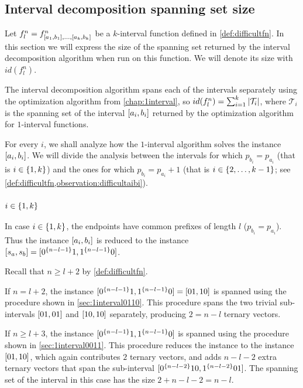 \subsection{Interval decomposition spanning set size}

Let $f_l^n =
f^n_{[a_1, b_1], \ldots, [a_k, b_k]}$
be a $k$-interval function
defined in \cref{def:difficultfn}.
In this section we will express
the size of the spanning set
returned by the interval decomposition algorithm
when run on this function.
We will denote its size with $id(f_l^n)$.

The interval decomposition algorithm spans
each of the intervals separately
using the optimization algorithm
from \cref{chap:1interval},
so $id(f_l^n) = \sum_{i=1}^k{\lvert\mathcal{T}_i\rvert}$,
where $\mathcal{T}_i$ is the spanning set
of the interval $[a_i, b_i]$
returned by the optimization algorithm
for $1$-interval functions.

For every $i$,
we shall analyze how the $1$-interval algorithm solves
the instance $[a_i, b_i]$.
We will divide the analysis between the intervals
for which $p_{b_i} = p_{a_i}$
(that is $i \in \{1, k\}$)
and the ones for which $p_{b_i} = p_{a_i} + 1$
(that is $i \in \{2, \ldots, k-1\}$;
see
\cref{def:difficultfn,observation:difficultaibi}).

\subsubsection{$i \in \{1, k\}$}

In case $i \in \{1, k\}$,
the endpoints have common prefixes of length $l$
($p_{b_i} = p_{a_i}$).
Thus the instance $[a_i, b_i]$
is reduced to the instance
$[s_a, s_b]
= [0^{\{n-l-1\}} 1, 1^{\{n-l-1\}} 0]$.

Recall that $n \geq l + 2$ by \cref{def:difficultfn}.

If $n = l + 2$,
the instance
$[0^{\{n-l-1\}} 1, 1^{\{n-l-1\}} 0]
= [01, 10]$
is spanned using the procedure
shown in \cref{sec:1interval0110}.
This procedure spans the two trivial sub-intervals
$[01, 01]$ and $[10, 10]$
separately,
producing $2 = n-l$ ternary vectors.

If $n \geq l + 3$,
the instance
$[0^{\{n-l-1\}} 1, 1^{\{n-l-1\}} 0]$
is spanned using the procedure
shown in \cref{sec:1interval0011}.
This procedure reduces the instance
to the instance $[01, 10]$,
which again contributes $2$ ternary vectors,
and adds $n-l-2$ extra ternary vectors
that span the sub-interval
$[0^{\{n-l-2\}} 10, 1^{\{n-l-2\}} 01]$.
The spanning set of the interval in this case has the size
$2 + n - l - 2 = n - l$.

